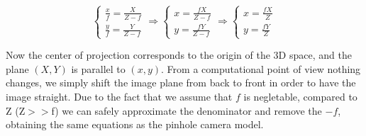 \[
    \begin{cases}
        \frac{x}{f} = \frac{X}{Z-f} \\
        \frac{y}{f} = \frac{Y}{Z-f}
    \end{cases} \Rightarrow \begin{cases}
        x = \frac{fX}{Z-f} \\
        y = \frac{fY}{Z-f}
    \end{cases} \Rightarrow \begin{cases}
        x = \frac{fX}{Z} \\
        y = \frac{fY}{Z}
    \end{cases}
\]

Now the center of projection corresponds to the origin of the 3D space, and the plane $(X,Y)$ is parallel to $(x,y)$. From a computational point of view nothing changes, we simply shift the image plane from back to front in order to have the image straight. Due to the fact that we assume that $f$ is negletable, compared to Z (Z$>>$f) we can safely approximate the denominator and remove the $-f$, obtaining the same equations as the pinhole camera model.


